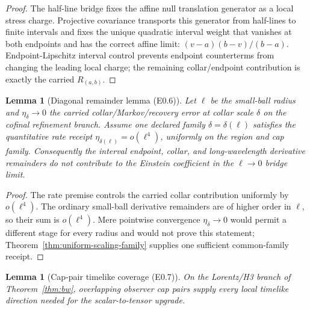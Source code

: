 \documentclass[11pt]{article}
\newtheorem{lemma}[theorem]{Lemma}
\begin{document}
\begin{proof}
The half-line bridge fixes the affine null translation generator as a local
stress charge.  Projective covariance transports this generator from
half-lines to finite intervals and fixes the unique quadratic interval weight
that vanishes at both endpoints and has the correct affine limit:
\((v-a)(b-v)/(b-a)\).  Endpoint-Lipschitz interval control prevents endpoint
counterterms from changing the leading local charge; the remaining
collar/endpoint contribution is exactly the carried \(R_{(a,b)}\).
\end{proof}

\begin{lemma}[Diagonal remainder lemma (E0.6)]\label{lem:diagonal-remainder}
Let \(\ell\) be the small-ball radius and \(\eta_\delta\to0\) the carried
collar/Markov/recovery error at collar scale \(\delta\) on the cofinal
refinement branch. Assume one declared family
\(\delta=\delta(\ell)\) satisfies the quantitative rate receipt
\(\eta_{\delta(\ell)}=o(\ell^4)\), uniformly on the region and cap family.
Consequently the interval endpoint,
collar, and long-wavelength derivative remainders do not contribute to the
Einstein coefficient in the \(\ell\to0\) bridge limit.
\end{lemma}

\begin{proof}
The rate premise controls the carried collar contribution uniformly by
\(o(\ell^4)\). The ordinary small-ball derivative remainders are of higher
order in \(\ell\), so their sum is \(o(\ell^4)\). Mere pointwise convergence
\(\eta_\delta\to0\) would permit a different stage for every radius and would
not prove this statement; Theorem~\ref{thm:uniform-scaling-family} supplies
one sufficient common-family receipt.
\end{proof}

\begin{lemma}[Cap-pair timelike coverage (E0.7)]\label{lem:cap-pair-timelike-coverage}
On the Lorentz/H3 branch of Theorem~\ref{thm:bw}, overlapping observer cap
pairs supply every local timelike direction needed for the scalar-to-tensor
upgrade.
\end{lemma}
\end{document}

